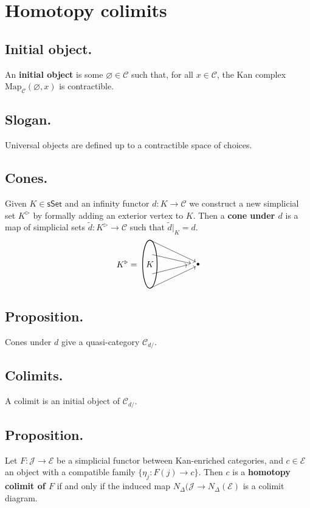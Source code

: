 \documentclass{article}
\numberwithin{equation}{subsection}
\renewcommand{\ss}[1]{\subsection{#1}}
\newcommand{\sset}{\mathsf{sSet}}
\newcommand{\C}{\mathcal{C}}
\newcommand{\Map}{\mathrm{Map}}
\begin{document}
    \section{Homotopy colimits}

        \ss{Initial object.}
            An \textbf{initial object} is some $\varnothing\in\C$ such that, for all $x\in\C$, the Kan complex $\Map_\C(\varnothing,x)$ is contractible.

        \ss{Slogan.}
            Universal objects are defined up to a contractible space of choices.

        \ss{Cones.}
            Given $K\in\sset$ and an infinity functor $d\colon K\to\C$ we construct a new simplicial set $K^\triangleright$ by formally adding an exterior vertex to $K$.
            Then a \textbf{cone under $d$} is a map of simplicial sets $\tilde{d}\colon K^\triangleright\to\C$ such that $\tilde{d}|_K=d$.
            \[
                K^\triangleright =\,\,
                \begin{tikzpicture}[baseline=-0.35em]
                    \draw [thick] (0,0) ellipse (0.3cm and 1cm);
                    \node at (0,0) {$K$};
                    \draw [->] (0,1) -- (1.9,0.1);
                    \draw [->] (0.1,0.4) -- (1.7,0.03);
                    \draw [->] (0.1,-0.4) -- (1.55,.-0.03);
                    \draw [->] (0,-1) -- (1.9,-0.1);
                    \draw [fill] (2,0) circle [radius=0.05];
                \end{tikzpicture}
            \]

        \ss{Proposition.}
            Cones under $d$ give a quasi-category $\C_{d/}$.

        \ss{Colimits.}
            A colimit is an initial object of $\C_{d/}$.

        \ss{Proposition.}
            Let $F\colon\mathcal{J}\to\mathcal{E}$ be a simplicial functor between Kan-enriched categories, and $c\in\mathcal{E}$ an object with a compatible family $\{\eta_{j}\colon F(j)\to c\}$.
            Then $c$ is a \textbf{homotopy colimit of $F$} if and only if the induced map $N_\Delta(\mathcal{J}\to N_\Delta(\mathcal{E})$ is a colimit diagram.
\end{document}
